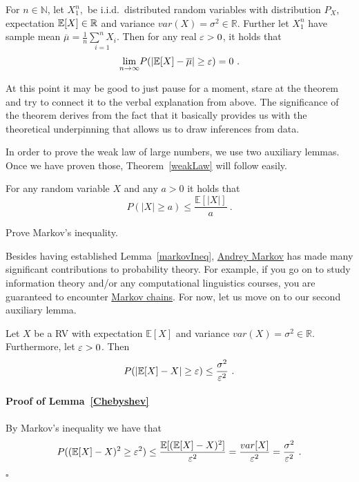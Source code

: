 \begin{Theorem}\label{weakLaw}
For $n \in \mathbb{N}$, let $X_{1}^{n},$ be  i.i.d.\ distributed random variables with distribution $ P_{X} $, expectation $ \mathbb{E}[X] \in \mathbb{R} $
and variance $ var(X) = \sigma^{2} \in \mathbb{R} $. Further let
$ X_{1}^{n} $ have sample mean $ \overline{\mu} = \frac{1}{n} \underset{i=1}{\overset{n}{\sum}X_{i}} $. Then for any real $ \varepsilon > 0 $, it holds that 
$$ \underset{n \rightarrow \infty}{\lim}P(|\mathbb{E}[X] - \overline{\mu}| \geq \eps) = 0 \ . $$
\end{Theorem}

At this point it may be good to just pause for a moment, stare at the theorem and try to connect it to the verbal explanation from above. The significance of the theorem
derives from the fact that it basically provides us with the theoretical underpinning that allows us to draw inferences from data.

In order to prove the weak law of large numbers, we use two auxiliary lemmas. Once we have proven those, Theorem~\ref{weakLaw} will follow easily. 

\begin{Lemma}\label{markovIneq}
For any random variable $ X $ and any $ a>0 $ it holds that
$$ P(|X| \geq a) \leq \dfrac{\mathbb{E}[|X|]}{a} \ . $$
\end{Lemma}

\begin{Exercise}
Prove Markov's inequality.
\end{Exercise}

Besides having established Lemma~\ref{markovIneq}, \href{https://en.wikipedia.org/wiki/Andrey_Markov}{Andrey Markov} has made many significant contributions to
probability theory. For example, if you go on to study information theory and/or any computational linguistics courses, you are guaranteed to encounter \href{https://en.wikipedia.org/wiki/Markov_chain}{Markov chains}. For now, let us move on to our second auxiliary lemma.

\begin{Lemma}\label{Chebyshev}
Let $ X $ be a RV with expectation $ \mathbb{E}[X] $ and variance $ var(X) = \sigma^{2} \in \mathbb{R} $. Furthermore, let $ \varepsilon > 0 $. Then
$$ P( \left|\mathbb{E}[X] - X \right| \geq \varepsilon) \leq \dfrac{\sigma^{2}}{\varepsilon^{2}} \ . $$ 
\end{Lemma}

\paragraph{Proof of Lemma~\ref{Chebyshev}} 
By Markov's inequality we have that
\begin{equation}
P((\mathbb{E}[X] - X)^{2} \geq \varepsilon^{2}) \leq \frac{\mathbb{E}[(\mathbb{E}[X]-X)^2]}{\varepsilon^2} = \dfrac{var[X]}{\varepsilon^{2}} = \dfrac{\sigma^{2}}{\varepsilon^{2}} \ .
\end{equation}  
\hfill $ \square $ \bigskip


